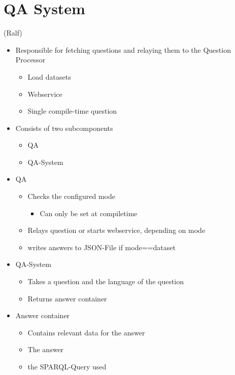 \documentclass[runningheads]{llncs}
\begin{document}
\section{QA System} (Ralf)

\begin{itemize}

	\item Responsible for fetching questions and relaying them to the Question Processor
		\begin{itemize}
			\item Load datasets
			\item Webservice
			\item Single compile-time question
		\end{itemize}

	\item Consists of two subcomponents
		\begin{itemize}
			\item QA
			\item QA-System
		\end{itemize}

	\item QA
		\begin{itemize}
			\item Checks the configured mode 
				\begin{itemize}
					\item Can only be set at compiletime
				\end{itemize}
			\item Relays question or starts webservice, depending on mode
			\item writes answers to JSON-File if mode==dataset
		\end{itemize}

	\item QA-System
		\begin{itemize}
			\item Takes a question and the language of the question
			\item Returns answer container
		\end{itemize}

	\item Answer container
		\begin{itemize}
			\item Contains relevant data for the answer
			\item The answer
			\item the SPARQL-Query used
		\end{itemize}
		
	
\end{itemize}
\end{document}
